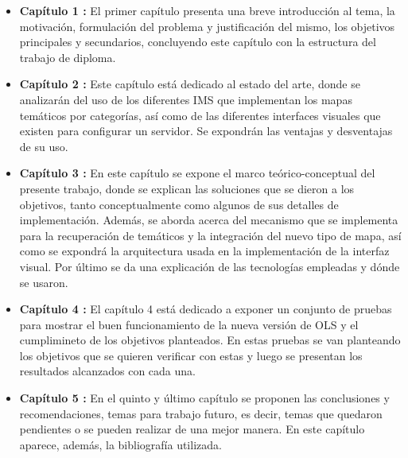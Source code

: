 \begin{itemize}
\item \textbf {Cap\'itulo 1 :} \qquad El primer cap\'itulo presenta una breve introducci\'on al tema, la motivaci\'on, formulaci\'on del problema y justificaci\'on del mismo, los objetivos principales y secundarios, concluyendo este cap\'itulo con la estructura del trabajo de diploma.
\item \textbf {Cap\'itulo 2 :} \qquad Este cap\'itulo est\'a dedicado al estado del arte, donde se analizar\'an del uso de los diferentes IMS que implementan los mapas tem\'aticos por categor\'ias, as\'i como de las diferentes interfaces visuales que existen para configurar un servidor. Se expondr\'an las ventajas y desventajas de su uso.
\item \textbf {Cap\'itulo 3 :} \qquad En este cap\'itulo se expone el marco te\'orico-conceptual del presente trabajo, donde se explican las soluciones que se dieron a los objetivos, tanto conceptualmente como algunos de sus detalles de implementaci\'on. Adem\'as, se aborda acerca del mecanismo que se implementa para la recuperaci\'on de tem\'aticos y la integraci\'on del nuevo tipo de mapa, as\'i como se expondr\'a la arquitectura usada en la implementaci\'on de la interfaz visual. Por \'ultimo se da una explicaci\'on de las tecnolog\'ias empleadas y d\'onde se usaron.
\item \textbf {Cap\'itulo 4 :} \qquad El cap\'itulo 4 est\'a dedicado a exponer un conjunto de pruebas para mostrar el buen funcionamiento de la nueva versi\'on de OLS y el cumplimineto de los objetivos planteados. En estas pruebas se van planteando los objetivos que se quieren verificar con estas y luego se presentan los resultados alcanzados con cada una.
\item \textbf {Cap\'itulo 5 :} \qquad En el quinto y \'ultimo cap\'itulo se proponen las conclusiones y recomendaciones, temas para trabajo futuro, es decir, temas que quedaron pendientes o se pueden realizar de una mejor manera. En este cap\'itulo aparece, adem\'as, la bibliograf\'ia utilizada.
\end{itemize}


